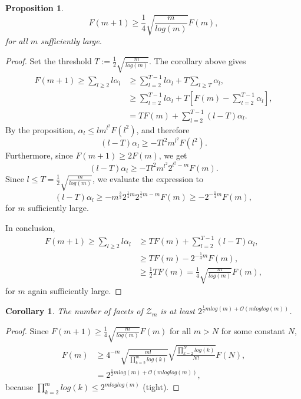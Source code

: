 \documentclass[12pt]{report}
\newtheorem*{proposition}{Proposition}
\newtheorem*{corollary}{Corollary}
\newcommand{\mZ}{\mathcal{Z}}
\begin{document}
\begin{proposition}
\[
F(m+1) \geq \frac14 \sqrt{\frac{m}{log(m)}} F(m),
\]
for all $m$ sufficiently large.
\end{proposition}
\begin{proof}
Set the threshold $T := \frac12 \sqrt{\frac{m}{log(m)}}$. The corollary above gives
\begin{align*}
F(m+1) \geq \sum_{l \geq 2} l \alpha_l &\geq \sum_{l=2}^{T-1} l \alpha_l + T \sum_{l\geq T} \alpha_l, \\
							 &\geq \sum_{l=2}^{T-1} l \alpha_l + T \left[ F(m) - \sum_{l=2}^{T-1} \alpha_l \right], \\
							 &= T F(m) + \sum_{l=2}^{T-1} (l-T) \alpha_l.
\end{align*}
By the proposition, $\alpha_l \leq l m^{l^2} F(l^2)$, and therefore
\[
(l-T) \alpha_l \geq -T l^2 m^{l^2} F(l^2).
\]
Furthermore, since $F(m+1) \geq 2F(m)$, we get
\[
(l-T) \alpha_l \geq -T l^2 m^{l^2} 2^{l^2 - m} F(m).
\]
Since $l\leq T=  \frac12 \sqrt{\frac{m}{log(m)}}$, we evaluate the expression to
\[
(l-T) \alpha_l \geq - m^{\frac32} 2^{\frac14 m} 2^{\frac14 m - m} F(m) \geq - 2^{-\frac14 m} F(m),
\]
for $m$ sufficiently large.

In conclusion, 
\begin{align*}
F(m+1) \geq \sum_{l \geq 2} l \alpha_l &\geq  T F(m) + \sum_{l=2}^{T-1} (l-T) \alpha_l, \\
							  &\geq T F(m) - 2^{-\frac14 m} F(m), \\
							  &\geq \frac12 T F(m) =  \frac14 \sqrt{\frac{m}{log(m)}} F(m),
\end{align*}
for $m$ again sufficiently large.
\end{proof}

\begin{corollary}
The number of facets of $\mZ_m$ is at least $2^{\frac12 m log(m) + \mathcal{O}(m loglog(m))}$.
\end{corollary}
\begin{proof}
Since $F(m+1) \geq \frac14 \sqrt{\frac{m}{log(m)}} F(m)$ for all $m > N$ for some constant $N$, 
\begin{align*}
F(m) &\geq 4^{-m} \sqrt{\frac{m!}{\prod_{k=2}^{m} log(k)}} \sqrt{\frac{\prod_{k=2}^{N} log(k) }{N!}} F(N), \\
	&= 2^{\frac12 m log(m) + \mathcal{O}(m loglog(m))},
\end{align*}
because $\prod_{k=2}^{m} log(k) \leq 2^{m loglog(m)}$ (tight).
\end{proof}
\end{document}
